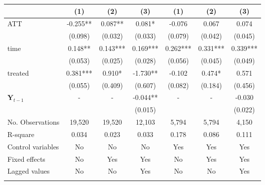 \documentclass[a4paper, 12pt]{article}
\begin{document}
\begin{table}[H]
\begin{subtable}[t]{\linewidth}
\begin{adjustbox}{max width=\textwidth}
\begin{tabular}{@{\extracolsep{4pt}}l*{6}{c}@{}}
                    &         (1)   &         (2)   &         (3)   &         (1)   &         (2)   &         (3)   \\
\hline
ATT                 &      -0.255**&       0.087** &      0.081*   &      -0.076   &      0.067   &      0.074 \\
                    &     (0.098)   &     (0.032)   &     (0.033)   &     (0.079)   &     (0.042)   &     (0.045)  \\
time                  &      0.148**&       0.143*** &      0.169***   &      0.262***   &     0.331***   &      0.339***   \\
                    &     (0.053)   &     (0.025)   &     (0.028)   &     (0.056)   &     (0.045)    &     (0.049)   \\
treated                 &      0.381***&       0.910* &      -1.730**   &      -0.102   &      0.474*   &      0.571 \\
                    &     (0.055)   &     (0.409)   &     (0.607)   &     (0.082)   &     (0.184)   &    (0.456) \\
$\mathbf{Y}_{t-1}$              &       -        &        -       &       -0.044**&         -      &        -       &       -0.030\\
                    &               &               &     (0.015)   &               &               &     (0.022) \\
\hline
No. Observations        &       19,520   &       19,520   &       12,103   &        5,794   &        5,794   &        4,150   \\
R-square            &       0.034   &       0.023   &       0.033   &       0.178   &       0.086   &       0.111   \\
\hline Control variables&          No   &          No   &          No   &          Yes   &          Yes   &          Yes   \\
Fixed effects       &          No   &         Yes   &          Yes   &          No   &         Yes   &          Yes   \\
Lagged values        &          No   &          No   &         Yes   &          No   &          No   &         Yes   \vspace{-7pt} \\
             \noalign{\smallskip} \bottomrule            \end{tabular}            \medskip           

\end{adjustbox}
\end{subtable}
\end{table}
\end{document}
